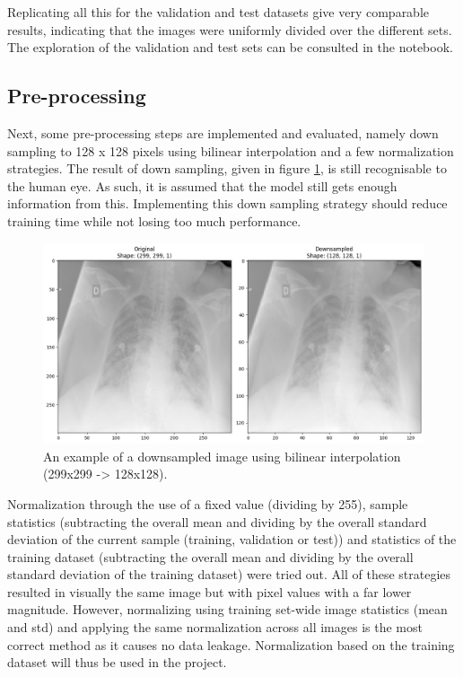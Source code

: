 \documentclass[conference]{IEEEtran}
\begin{document}
Replicating all this for the validation and test datasets give very comparable results, indicating that the images were uniformly divided over the different sets. The exploration of the validation and test sets can be consulted in the notebook.

\subsection{Pre-processing}
Next, some pre-processing steps are implemented and evaluated, namely down sampling to 128 x 128 pixels using bilinear interpolation and a few normalization strategies. The result of down sampling, given in figure \ref{fig:downsample}, is still recognisable to the human eye. As such, it is assumed that the model still gets enough information from this. Implementing this down sampling strategy should reduce training time while not losing too much performance.

\begin{figure}[htbp]
\centerline{\includegraphics[width=\linewidth]{Images/downsample.png}}
\caption{An example of a downsampled image using bilinear interpolation (299x299 -> 128x128).}
\label{fig:downsample}
\end{figure}

Normalization through the use of a fixed value (dividing by 255), sample statistics (subtracting the overall mean and dividing by the overall standard deviation of the current sample (training, validation or test)) and statistics of the training dataset (subtracting the overall mean and dividing by the overall standard deviation of the training dataset) were tried out. All of these strategies resulted in visually the same image but with pixel values with a far lower magnitude. However, normalizing using training set-wide image statistics (mean and std) and applying the same normalization across all images is the most correct method as it causes no data leakage. Normalization based on the training dataset will thus be used in the project.  
\end{document}
